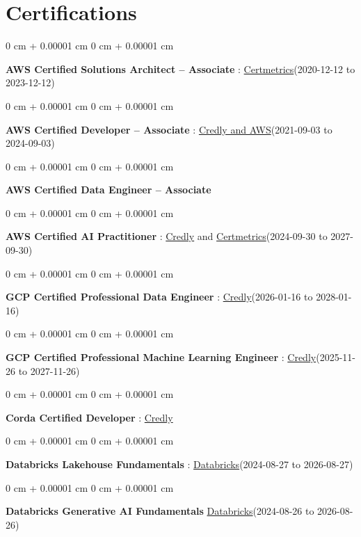 \documentclass[10pt, letterpaper]{article}
\newenvironment{onecolentry}{
    \begin{adjustwidth}{
        0 cm + 0.00001 cm
    }{
        0 cm + 0.00001 cm
    }
}{
    \end{adjustwidth}
} %
\begin{document}
    \vspace{2 pt }
    \section{Certifications}
        \vspace{2 pt }
        \begin{samepage}
            \begin{onecolentry}
                \textbf{AWS Certified Solutions Architect – Associate} : \href{https://cp.certmetrics.com/amazon/en/public/verify/credential/SNBY48EBJJVE1SWX}{Certmetrics}(2020-12-12 to 2023-12-12)
            \end{onecolentry}
            \begin{onecolentry}
                \textbf{AWS Certified Developer – Associate} : \href{https://www.credly.com/badges/b8106fbd-d3d1-4204-8cdf-e708798fd582/public_url}{Credly and AWS}(2021-09-03  to 2024-09-03)
            \end{onecolentry}
            \begin{onecolentry}
                \textbf{AWS Certified Data Engineer – Associate}
            \end{onecolentry}
            \begin{onecolentry}
                \textbf{AWS Certified AI Practitioner} : \href{https://www.credly.com/badges/451b7ba5-8be1-4a8e-bbec-ade26627a6b6/public_url}{Credly} and \href{https://cp.certmetrics.com/amazon/en/public/verify/credential/495f0d9853874bf9a33c17f8e89ce131}{Certmetrics}(2024-09-30 to 2027-09-30)
            \end{onecolentry}
            \begin{onecolentry}
                \textbf{GCP Certified Professional Data Engineer} : \href{https://www.credly.com/badges/977e96d9-12e7-4f6c-b8a7-df71fb7153b8/public_url}{Credly}(2026-01-16 to 2028-01-16)
            \end{onecolentry}
            \begin{onecolentry}
                \textbf{GCP Certified Professional Machine Learning Engineer} : \href{https://www.credly.com/badges/a6965347-09ea-4d8f-b398-0e151407160d/public_url}{Credly}(2025-11-26 to 2027-11-26)
            \end{onecolentry}
            \begin{onecolentry}
                \textbf{Corda Certified Developer} : \href{https://www.credly.com/badges/7f29d39c-34b6-4de9-b07d-e10f1090a335/linked_in_profile}{Credly}
            \end{onecolentry}
                \begin{onecolentry}
                \textbf{Databricks Lakehouse Fundamentals} : \href{https://scl.io/FXGKS0u}{Databricks}(2024-08-27 to 2026-08-27)
            \end{onecolentry}
            \begin{onecolentry}
                \textbf{Databricks Generative AI Fundamentals} \href{https://sgq.io/3uIFGNi}{Databricks}(2024-08-26 to 2026-08-26)
            \end{onecolentry}
        \end{samepage}
\end{document}
